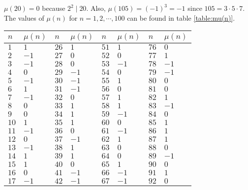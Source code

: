 	\begin{example}
		$\mu(20)=0$ because $2^2\mid 20$. Also, $\mu(105)=(-1)^3=-1$ since $105=3\cdot5 \cdot 7$. The values of $\mu(n)$ for $n=1,2,\cdots,100$ can be found in table \ref{table:mu(n)}.
		\begin{table}
			\centering
			\begin{tabular}{ | l | l | l | l | l | l | l | l | }
				\hline
				$n$  &
	     $\mu(n)$&
	               $n$  &
	                   $\mu(n)$&
	                            $n$   &
	                                 $\mu(n)$&
	                                            $n$  &
	                                                  $\mu(n)$ \\ \hline
				$1$  & $1$   & $26$ & $1$  & $51$ & $1$  & $76$  & $0$     \\ \hline
				$2$  & $-1$  & $27$ & $0$  & $52$ & $0$  & $77$  & $1$     \\ \hline
				$3$  & $-1$  & $28$ & $0$  & $53$ & $-1$ & $78$  & $-1$    \\ \hline
				$4$  & $0$   & $29$ & $-1$ & $54$ & $0$  & $79$  & $-1$    \\ \hline
				$5$  & $-1$  & $30$ & $-1$ & $55$ & $1$  & $80$  & $0$     \\ \hline
				$6$  & $1$   & $31$ & $-1$ & $56$ & $0$  & $81$  & $0$     \\ \hline
				$7$  & $-1$  & $32$ & $0$  & $57$ & $1$  & $82$  & $1$     \\ \hline
				$8$  & $0$   & $33$ & $1$  & $58$ & $1$  & $83$  & $-1$    \\ \hline
				$9$  & $0$   & $34$ & $1$  & $59$ & $-1$ & $84$  & $0$     \\ \hline
				$10$ & $1$   & $35$ & $1$  & $60$ & $0$  & $85$  & $1$     \\ \hline
				$11$ & $-1$  & $36$ & $0$  & $61$ & $-1$ & $86$  & $1$     \\ \hline
				$12$ & $0$   & $37$ & $-1$ & $62$ & $1$  & $87$  & $1$     \\ \hline
				$13$ & $-1$  & $38$ & $1$  & $63$ & $0$  & $88$  & $0$     \\ \hline
				$14$ & $1$   & $39$ & $1$  & $64$ & $0$  & $89$  & $-1$    \\ \hline
				$15$ & $1$   & $40$ & $0$  & $65$ & $1$  & $90$  & $0$     \\ \hline
				$16$ & $0$   & $41$ & $-1$ & $66$ & $-1$ & $91$  & $1$     \\ \hline
				$17$ & $-1$  & $42$ & $-1$ & $67$ & $-1$ & $92$  & $0$     \\ \hline

\end{tabular}
\end{table}
\end{example}
